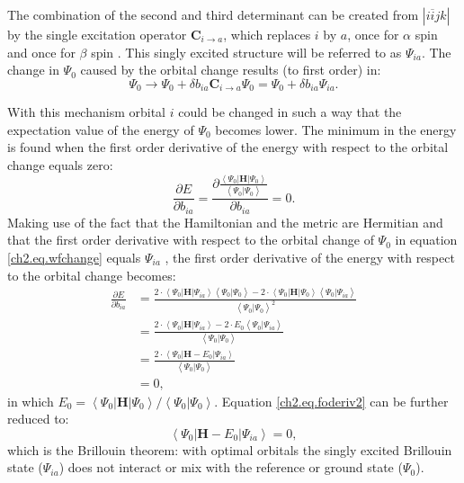 The combination of the second and third determinant can be created from $|i\overline{i}jk |$ by the single excitation operator $\mathbf{C}_{i \rightarrow a}$, which replaces $i$ by $a$, once for $\alpha$ spin and once for $\beta$ spin \cite{ruttink}. This singly excited structure will be referred to as $\Psi_{ia}$.   The change in $\Psi_0$ caused by the orbital change results (to first order) in:
\begin{equation}
\Psi_{0} \rightarrow \Psi_{0} + \delta b_{ia} \mathbf{C}_{i \rightarrow a} \Psi_{0} = \Psi_{0} + \delta b_{ia} \Psi_{ia}.
\label{ch2.eq.wfchange}
\end{equation}

With this mechanism orbital $i$ could be changed in such a way that the expectation value of the energy of $\Psi_0$ becomes lower. The minimum in the energy is found when the first order derivative of the energy with respect to the orbital change equals zero:
\begin{equation}
\frac{\partial E}{\partial b_{ia}}=\frac{\partial \frac{\left < \Psi_0 | \mathbf{H} | \Psi_0 \right >}{\left < \Psi_0 | \Psi_0 \right >}}{\partial b_{ia}}=0.
\label{ch2.eq.foderiv}
\end{equation}
Making use of the fact that the Hamiltonian and the metric are Hermitian and that the first order derivative with respect to the orbital change of $\Psi_0$ in equation \ref{ch2.eq.wfchange} equals $\Psi_{ia}$ \cite{vbscf2}, the first order derivative of the energy with respect to the orbital change becomes: 
\begin{equation}
\begin{split}
\frac{\partial E}{\partial b_{ia}} & = \frac{2 \cdot \left < \Psi_0 | \mathbf{H} | \Psi_{ia} \right > \left< \Psi_0 | \Psi_0 \right > - 2 \cdot \left < \Psi_0 | \mathbf{H} | \Psi_0  \right > \left< \Psi_0 | \Psi_{ia}\right>}{\left < \Psi_0 | \Psi_0 \right > ^2 }\\
& = \frac{ 2 \cdot \left < \Psi_0 | \mathbf{H} | \Psi_{ia} \right > - 2 \cdot E_0 \left< \Psi_0 | \Psi_{ia} \right >}{\left < \Psi_0 | \Psi_0 \right >}\\
& = \frac{ 2 \cdot \left < \Psi_0 | \mathbf{H} -E_0 | \Psi_{ia} \right >}{\left < \Psi_0 | \Psi_0 \right >}\\
& = 0,
\end{split}
\label{ch2.eq.foderiv2}
\end{equation}
in which $E_0 = \left < \Psi_0 | \mathbf{H} | \Psi_0 \right > / \left < \Psi_0 | \Psi_0 \right >$. Equation \ref{ch2.eq.foderiv2} can be further reduced to:
\begin{equation}
\left < \Psi_0 | \mathbf{H} - E_0 | \Psi_{ia} \right > = 0,
\label{ch2.eq.brillouin}
\end{equation}
which is the Brillouin theorem: with optimal orbitals the singly excited Brillouin state ($\Psi_{ia}$) does not interact or mix with the reference or ground state ($\Psi_0$). 

